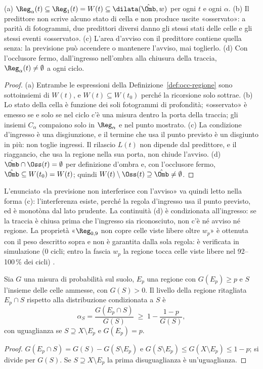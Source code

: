 \begin{proposizione}\label{prop:occ-annidamento}
(a) $\Reg_\alpha(t)\subseteq\Reg_1(t)=W(t)\subseteq\dilata(\hat\Omb,w)$ per ogni $t$ e ogni $\alpha$. (b) Il predittore non scrive alcuno stato di cella e non produce uscite «osservato»: a parità di fotogrammi, due predittori diversi danno gli stessi stati delle celle e gli stessi eventi «osservato». (c) L'area d'avviso con il predittore contiene quella senza: la previsione può accendere o mantenere l'avviso, mai toglierlo. (d) Con l'occlusore fermo, dall'ingresso nell'ombra alla chiusura della traccia, $\Reg_\alpha(t)\neq\emptyset$ a ogni ciclo. 
\end{proposizione}
\begin{proof}
(a) Entrambe le espressioni della Definizione~\ref{def:occ-regione} sono sottoinsiemi di $W(t)$, e $W(t)\subseteq W(t_0)$ perché la ricorsione solo sottrae. (b) Lo stato della cella è funzione dei soli fotogrammi di profondità; «osservato» è emesso se e solo se nel ciclo c'è una misura dentro la porta della traccia; gli insiemi $C_\alpha$ compaiono solo in $\Reg_\alpha$ e nel punto mostrato. (c) La condizione d'ingresso è una disgiunzione, e il termine che usa il punto previsto è un disgiunto in più: non toglie ingressi. Il rilascio $L(t)$ non dipende dal predittore, e il riaggancio, che usa la regione nella sua porta, non chiude l'avviso. (d) $\hat\Omb\cap\Oss(t)=\emptyset$ per definizione d'ombra e, con l'occlusore fermo, $\hat\Omb\subseteq W(t_0)=W(t)$; quindi $W(t)\setminus\Oss(t)\supseteq\hat\Omb\neq\emptyset$.
\end{proof}

L'enunciato «la previsione non interferisce con l'avviso» va quindi letto nella forma (c): l'interferenza esiste, perché la regola d'ingresso usa il punto previsto, ed è monotòna dal lato prudente. La continuità (d) è condizionata all'ingresso: se la traccia è chiusa prima che l'ingresso sia riconosciuto, non c'è né avviso né regione. La proprietà «$\Reg_{0,9}$ non copre celle viste libere oltre $w_p$» è ottenuta con il peso descritto sopra e non è garantita dalla sola regola: è verificata in simulazione (0 cicli; entro la fascia $w_p$ la regione tocca celle viste libere nel 92--100\,\% dei cicli) .

\begin{proposizione}\label{prop:occ-ritaglio}
Sia $G$ una misura di probabilità sul suolo, $E_p$ una regione con $G(E_p)\ge p$ e $S$ l'insieme delle celle ammesse, con $G(S)>0$. Il livello della regione ritagliata $E_p\cap S$ rispetto alla distribuzione condizionata a $S$ è
\begin{equation}\label{eq:occ-ritaglio}
\alpha_S=\frac{G(E_p\cap S)}{G(S)}\;\ge\;1-\frac{1-p}{G(S)},
\end{equation}
con uguaglianza se $S\supseteq X\setminus E_p$ e $G(E_p)=p$. 
\end{proposizione}
\begin{proof}
$G(E_p\cap S)=G(S)-G(S\setminus E_p)$ e $G(S\setminus E_p)\le G(X\setminus E_p)\le1-p$; si divide per $G(S)$. Se $S\supseteq X\setminus E_p$ la prima disuguaglianza è un'uguaglianza.
\end{proof}

